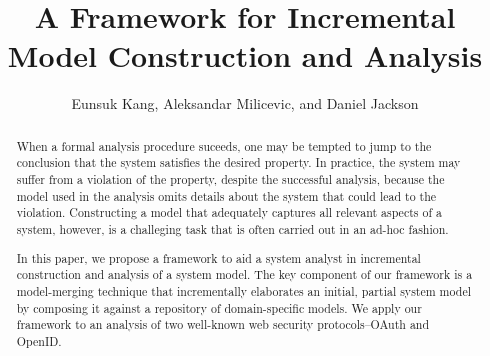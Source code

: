\documentclass{llncs}
\def\mytitle{A Framework for Incremental Model Construction and Analysis}
\begin{document}
\title{\mytitle}
%
%
\author{Eunsuk Kang, Aleksandar Milicevic, and Daniel Jackson}
%

\maketitle              %

\begin{abstract}
  When a formal analysis procedure suceeds, one may be tempted to jump to
  the conclusion that the system satisfies the desired property. In
  practice, the system may suffer from a violation of the property,
  despite the successful analysis, because the model used in the
  analysis omits details about the system that could lead to the
  violation. Constructing a model that adequately captures all
  relevant aspects of a system, however, is a challeging task that is
  often carried out in an ad-hoc fashion.

  In this paper, we propose a framework to aid a system analyst in
  incremental construction and analysis of a system model. The key
  component of our framework is a model-merging technique that
  incrementally elaborates an initial, partial system model by
  composing it against a repository of domain-specific models. We
  apply our framework to an analysis of two well-known web security
  protocols--OAuth and OpenID.
\end{abstract}










%
%
%





%


\end{document}
